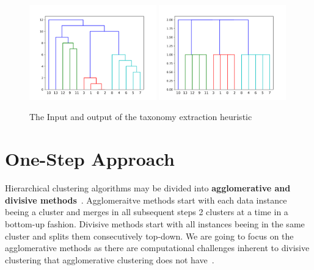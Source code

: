 \begin{figure}[hb]
    \includegraphics[width=0.49\textwidth]{img/extract_ex_dendro.png}
        \includegraphics[width=0.49\textwidth]{img/extract_ex_taxo.png}
    \caption{The Input and output of the taxonomy extraction heuristic}
    \label{fig:my_label}
\end{figure}


\section{One-Step Approach}\label{\positionnumber}
Hierarchical clustering algorithms may be divided into \textbf{agglomerative and divisive methods}~\cite{han2011data}. Agglomeraitve methods start with each data instance beeing a cluster and merges in all subsequent steps 2 clusters at a time in a bottom-up fashion. Divisive methods start with all instances beeing in the same cluster and splits them consecutively top-down. We are going to focus on the agglomerative methods as there are computational challenges inherent to divisive clustering that agglomerative clustering does not have~\cite{han2011data}. \\

